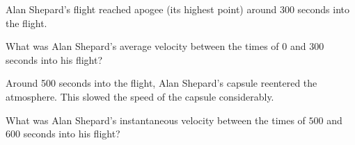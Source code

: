 \documentclass{ximera}
\begin{document}
Alan Shepard's flight reached apogee (its highest point) around 300
seconds into the flight.

\begin{question}
  What was Alan Shepard's average velocity between the times of $0$ and
  $300$ seconds into his flight?
  \begin{solution}
    \begin{multiple-choice}
    \end{multiple-choice}  
  \end{solution}
\end{question}

Around 500 seconds into the flight, Alan Shepard's capsule reentered
the atmosphere. This slowed the speed of the capsule considerably.

\begin{question}
  What was Alan Shepard's instantaneous velocity between the times of
  $500$ and $600$ seconds into his flight?
  \begin{solution}
    \begin{multiple-choice}
    \end{multiple-choice}  
  \end{solution}
\end{question}
\end{document}
